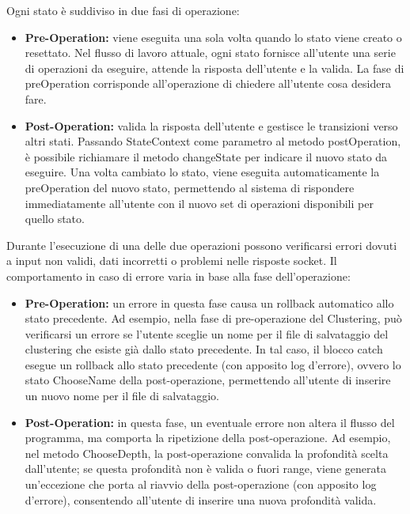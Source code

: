 \begin{enumerate}
    Ogni stato è suddiviso in due fasi di operazione:
    \begin{itemize}
        \item \textbf{Pre-Operation:} viene eseguita una sola volta quando lo stato viene creato o resettato. Nel flusso di lavoro attuale, ogni stato fornisce all'utente una serie di operazioni da eseguire, attende la risposta dell'utente e la valida. La fase di preOperation corrisponde all'operazione di chiedere all'utente cosa desidera fare.
        \item \textbf{Post-Operation:} valida la risposta dell'utente e gestisce le transizioni verso altri stati. Passando StateContext come parametro al metodo postOperation, è possibile richiamare il metodo changeState per indicare il nuovo stato da eseguire. Una volta cambiato lo stato, viene eseguita automaticamente la preOperation del nuovo stato, permettendo al sistema di rispondere immediatamente all'utente con il nuovo set di operazioni disponibili per quello stato.
    \end{itemize}
    
    Durante l'esecuzione di una delle due operazioni possono verificarsi errori dovuti a input non validi, dati incorretti o problemi nelle risposte socket. Il comportamento in caso di errore varia in base alla fase dell'operazione:
    \begin{itemize}
        \item \textbf{Pre-Operation:} un errore in questa fase causa un rollback automatico allo stato precedente. Ad esempio, nella fase di pre-operazione del Clustering, può verificarsi un errore se l'utente sceglie un nome per il file di salvataggio del clustering che esiste già dallo stato precedente. In tal caso, il blocco catch esegue un rollback allo stato precedente (con apposito log d'errore), ovvero lo stato ChooseName della post-operazione, permettendo all'utente di inserire un nuovo nome per il file di salvataggio.
        \item \textbf{Post-Operation:} in questa fase, un eventuale errore non altera il flusso del programma, ma comporta la ripetizione della post-operazione. Ad esempio, nel metodo ChooseDepth, la post-operazione convalida la profondità scelta dall'utente; se questa profondità non è valida o fuori range, viene generata un'eccezione che porta al riavvio della post-operazione (con apposito log d'errore), consentendo all'utente di inserire una nuova profondità valida.
    \end{itemize}
\end{enumerate}
